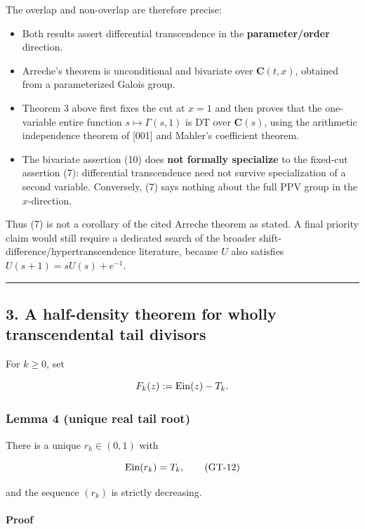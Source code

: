 The overlap and non-overlap are therefore precise:

\begin{itemize}
\tightlist
\item
  Both results assert differential transcendence in the \textbf{parameter/order}
  direction.
\item
  Arreche's theorem is unconditional and bivariate over \(\mathbf C(t,x)\),
  obtained from a parameterized Galois group.
\item
  Theorem 3 above first fixes the cut at \(x=1\) and then proves that the
  one-variable entire function \(s\mapsto\Gamma(s,1)\) is DT over
  \(\mathbf C(s)\), using the arithmetic independence theorem of {[}001{]} and
  Mahler's coefficient theorem.
\item
  The bivariate assertion (10) does \textbf{not formally specialize} to the
  fixed-cut assertion (7): differential transcendence need not survive
  specialization of a second variable. Conversely, (7) says nothing about
  the full PPV group in the \(x\)-direction.
\end{itemize}

Thus (7) is not a corollary of the cited Arreche theorem as stated. A final
priority claim would still require a dedicated search of the broader
shift-difference/hypertranscendence literature, because \(U\) also satisfies
\(U(s+1)=sU(s)+e^{-1}\).

\begin{center}\rule{0.5\linewidth}{0.5pt}\end{center}

\subsection{3. A half-density theorem for wholly transcendental tail divisors}

For \(k\ge0\), set

\[
 F_k(z):=\operatorname{Ein}(z)-T_k.
\]

\subsubsection{Lemma 4 (unique real tail root)}

There is a unique \(r_k\in(0,1)\) with

\[
 \operatorname{Ein}(r_k)=T_k,                                                             \tag{GT-12}
\]

and the sequence \((r_k)\) is strictly decreasing.

\paragraph{Proof}

